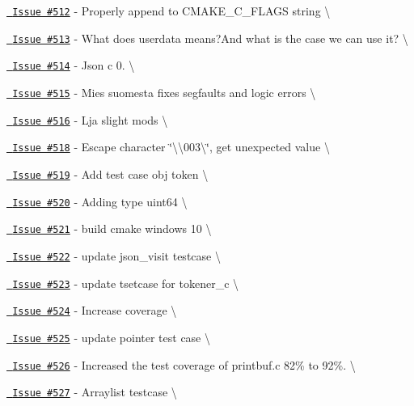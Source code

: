 \begin{DoxyItemize}
\item \href{https://github.com/json-c/json-c/issues/512}{\texttt{ Issue \#512}} -\/ Properly append to CMAKE\+\_\+\+C\+\_\+\+FLAGS string \textbackslash{}
\item \href{https://github.com/json-c/json-c/issues/513}{\texttt{ Issue \#513}} -\/ What does {\ttfamily userdata} means?And what is the case we can use it? \textbackslash{}
\item \href{https://github.com/json-c/json-c/issues/514}{\texttt{ Issue \#514}} -\/ Json c 0. \textbackslash{}
\item \href{https://github.com/json-c/json-c/issues/515}{\texttt{ Issue \#515}} -\/ Mies suomesta fixes segfaults and logic errors \textbackslash{}
\item \href{https://github.com/json-c/json-c/issues/516}{\texttt{ Issue \#516}} -\/ Lja slight mods \textbackslash{}
\item \href{https://github.com/json-c/json-c/issues/518}{\texttt{ Issue \#518}} -\/ Escape character \char`\"{}\textbackslash{}\textbackslash{}003\textbackslash{}\char`\"{}, get unexpected value \textbackslash{}
\item \href{https://github.com/json-c/json-c/issues/519}{\texttt{ Issue \#519}} -\/ Add test case obj token \textbackslash{}
\item \href{https://github.com/json-c/json-c/issues/520}{\texttt{ Issue \#520}} -\/ Adding type uint64 \textbackslash{}
\item \href{https://github.com/json-c/json-c/issues/521}{\texttt{ Issue \#521}} -\/ build cmake windows 10 \textbackslash{}
\item \href{https://github.com/json-c/json-c/issues/522}{\texttt{ Issue \#522}} -\/ update json\+\_\+visit testcase \textbackslash{}
\item \href{https://github.com/json-c/json-c/issues/523}{\texttt{ Issue \#523}} -\/ update tsetcase for tokener\+\_\+c \textbackslash{}
\item \href{https://github.com/json-c/json-c/issues/524}{\texttt{ Issue \#524}} -\/ Increase coverage \textbackslash{}
\item \href{https://github.com/json-c/json-c/issues/525}{\texttt{ Issue \#525}} -\/ update pointer test case \textbackslash{}
\item \href{https://github.com/json-c/json-c/issues/526}{\texttt{ Issue \#526}} -\/ Increased the test coverage of printbuf.\+c 82\% to 92\%. \textbackslash{}
\item \href{https://github.com/json-c/json-c/issues/527}{\texttt{ Issue \#527}} -\/ Arraylist testcase \textbackslash{}

\end{DoxyItemize}
